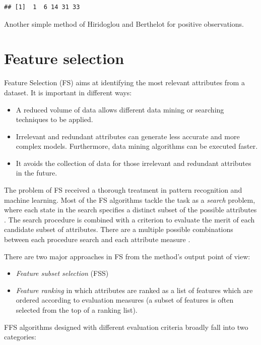 \documentclass[]{book}
\begin{document}
\begin{verbatim}
## [1]  1  6 14 31 33
\end{verbatim}

Another simple method of Hiridoglou and Berthelot for positive
observations.

\section{Feature selection}\label{feature-selection}

Feature Selection (FS) aims at identifying the most relevant attributes
from a dataset. It is important in different ways:

\begin{itemize}
\item
  A reduced volume of data allows different data mining or searching
  techniques to be applied.
\item
  Irrelevant and redundant attributes can generate less accurate and
  more complex models. Furthermore, data mining algorithms can be
  executed faster.
\item
  It avoids the collection of data for those irrelevant and redundant
  attributes in the future.
\end{itemize}

The problem of FS received a thorough treatment in pattern recognition
and machine learning. Most of the FS algorithms tackle the task as a
\emph{search} problem, where each state in the search specifies a
distinct subset of the possible attributes \citep{BL97}. The search
procedure is combined with a criterion to evaluate the merit of each
candidate subset of attributes. There are a multiple possible
combinations between each procedure search and each attribute measure
\citep{LY05}.

There are two major approaches in FS from the method's output point of
view:

\begin{itemize}
\item
  \emph{Feature subset selection} (FSS)
\item
  \emph{Feature ranking} in which attributes are ranked as a list of
  features which are ordered according to evaluation measures (a subset
  of features is often selected from the top of a ranking list).
\end{itemize}

FFS algorithms designed with different evaluation criteria broadly fall
into two categories:
\end{document}
